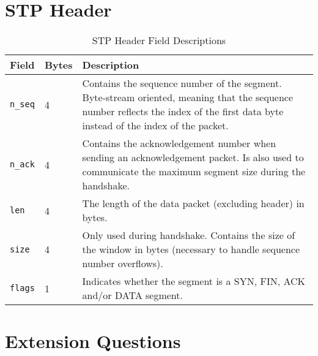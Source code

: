 \documentclass[a4paper]{article}
\begin{document}
\section{STP Header}

\begin{table}[H]
\centering
\caption{STP Header Field Descriptions}
\label{header}
\begin{tabular}{@{}llp{}@{}}
\toprule
Field & Bytes & Description \\ \midrule
\verb|n_seq| & 4 & Contains the sequence number  of the segment. Byte-stream oriented, meaning that the sequence number reflects the index of the first data byte instead of the index of the packet. \\
\verb|n_ack| & 4 & Contains the acknowledgement number when sending an acknowledgement packet. Is also used to communicate the maximum segment size during the handshake. \\
\verb|len| & 4 & The length of the data packet (excluding header) in bytes. \\
\verb|size| & 4 & Only used during handshake. Contains the size of the window in bytes (necessary to handle sequence number overflows). \\
\verb|flags| & 1 & Indicates whether the segment is a SYN, FIN, ACK and/or DATA segment. \\ \bottomrule
\end{tabular}
\end{table}

\section{Extension Questions}
\end{document}
